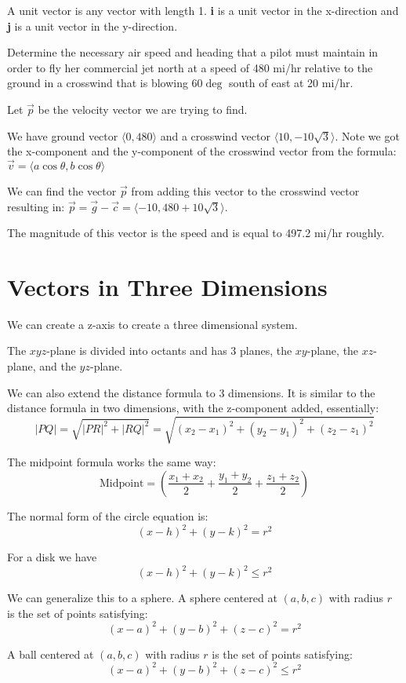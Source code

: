 \documentclass[../calc3.tex]{subfiles}
\begin{document}
A unit vector is any vector with length 1. \textbf{i} is a unit vector in the x-direction and \textbf{j} is a 
unit vector in the y-direction. 
\begin{example}
Determine the necessary air speed and heading that a pilot must maintain in order to 
fly her commercial jet north at a speed of 480 mi/hr relative to the ground in a crosswind that is 
blowing 60$\deg$ south of east at 20 mi/hr.

Let $\vec{p}$ be the velocity vector we are trying to find. 

We have ground vector $\langle0,480\rangle$ and a crosswind vector $\langle10,-10\sqrt{3}\rangle$. 
Note we got the x-component and the y-component of the crosswind vector from the formula: 
$\vec{v}=\langle a\cos\theta, b\cos\theta\rangle$

We can find the vector $\vec{p}$ from adding this vector to the crosswind vector resulting in: 
$\vec{p}=\vec{g}-\vec{c} = \langle-10,480+10\sqrt{3}\rangle$. 

The magnitude of this vector is the speed and is equal to 497.2 mi/hr roughly.
\end{example}

\section{Vectors in Three Dimensions}
We can create a z-axis to create a three dimensional system.

The $xyz$-plane is divided into octants and has 3 planes, the $xy$-plane, the $xz$-plane, and the $yz$-plane. 

We can also extend the distance formula to 3 dimensions. It is similar to the distance 
formula in two dimensions, with the z-component added, essentially:
\[|PQ|=\sqrt{|PR|^2+|RQ|^2}=\sqrt{(x_2-x_1)^2+(y_2-y_1)^2+(z_2-z_1)^2}\]

The midpoint formula works the same way:
\[\text{Midpoint}=\left(\frac{x_1+x_2}{2}+\frac{y_1+y_2}{2}+\frac{z_1+z_2}{2}\right)\]

The normal form of the circle equation is: 
\[(x-h)^2+(y-k)^2=r^2\]

For a disk we have 
\[(x-h)^2+(y-k)^2\leq r^2\]

We can generalize this to a sphere. A sphere centered at $(a,b,c)$ with radius $r$ is the set of points satisfying:
\[(x-a)^2+(y-b)^2+(z-c)^2=r^2\]

A ball centered at $(a,b,c)$ with radius $r$ is the set of points satisfying:
\[(x-a)^2+(y-b)^2+(z-c)^2\leq r^2\]
\end{document}
